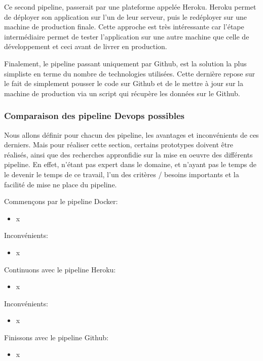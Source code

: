 \documentclass[
    iai, %
    il, %
]{heig-tb}
\begin{document}
Ce second pipeline, passerait par une plateforme appelée Heroku. Heroku permet de déployer son application sur l'un de leur serveur, puis le redéployer sur une machine de production finale.
Cette approche est très intéressante car l'étape intermédiaire permet de tester l'application sur une autre machine que celle de développement et ceci avant de livrer en production.

Finalement, le pipeline passant uniquement par Github, est la solution la plus simpliste en terme du nombre de technologies utilisées. Cette dernière repose sur le fait de simplement pousser le code sur Github et de le mettre à jour sur la machine de production via un script qui récupère les données sur le Github.

\subsubsection{Comparaison des pipeline Devops possibles}
Nous allons définir pour chacun des pipeline, les avantages et inconvénients de ces derniers.
Mais pour réaliser cette section, certains prototypes doivent être réalisés, ainsi que des recherches appronfidie sur la mise en oeuvre des différents pipeline.
En effet, n'étant pas expert dans le domaine, et n'ayant pas le temps de le devenir le temps de ce travail, l'un des critères / besoins importants et la facilité de mise ne place du pipeline.

Commençons par le pipeline Docker:
\begin{itemize}
    \item x
\end{itemize}

Inconvénients:
\begin{itemize}
    \item x
\end{itemize}

Continuons avec le pipeline Heroku:
\begin{itemize}
    \item x
\end{itemize}

Inconvénients:
\begin{itemize}
    \item x
\end{itemize}

Finissons avec le pipeline Github:
\begin{itemize}
    \item x
\end{itemize}
\end{document}
